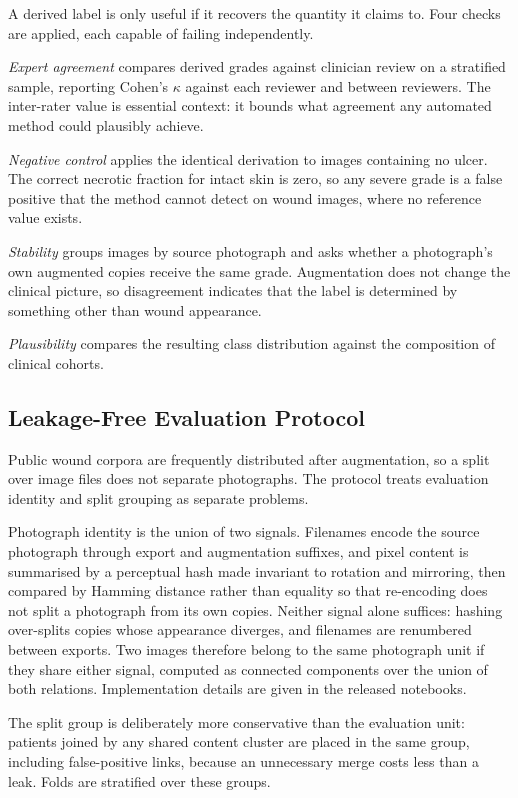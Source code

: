A derived label is only useful if it recovers the quantity it claims to.
Four checks are applied, each capable of failing independently.

\emph{Expert agreement} compares derived grades against clinician review on
a stratified sample, reporting Cohen's $\kappa$ against each reviewer and
between reviewers. The inter-rater value is essential context: it bounds
what agreement any automated method could plausibly achieve.

\emph{Negative control} applies the identical derivation to images
containing no ulcer. The correct necrotic fraction for intact skin is zero,
so any severe grade is a false positive that the method cannot detect on
wound images, where no reference value exists.

\emph{Stability} groups images by source photograph and asks whether a
photograph's own augmented copies receive the same grade. Augmentation does
not change the clinical picture, so disagreement indicates that the label
is determined by something other than wound appearance.

\emph{Plausibility} compares the resulting class distribution against the
composition of clinical cohorts.

\subsection{Leakage-Free Evaluation Protocol}

Public wound corpora are frequently distributed after augmentation, so a
split over image files does not separate photographs. The protocol treats
evaluation identity and split grouping as separate problems.

Photograph identity is the union of two signals. Filenames encode the
source photograph through export and augmentation suffixes, and pixel
content is summarised by a perceptual hash made invariant to rotation and
mirroring, then compared by Hamming distance rather than equality so that
re-encoding does not split a photograph from its own copies. Neither
signal alone suffices: hashing over-splits copies whose appearance
diverges, and filenames are renumbered between exports. Two images
therefore belong to the same photograph unit if they share either
signal, computed as connected components over the union of both
relations. Implementation details are given in the released notebooks.

The split group is deliberately more conservative than the evaluation unit:
patients joined by any shared content cluster are placed in the same group,
including false-positive links, because an unnecessary merge costs less
than a leak. Folds are stratified over these groups.

